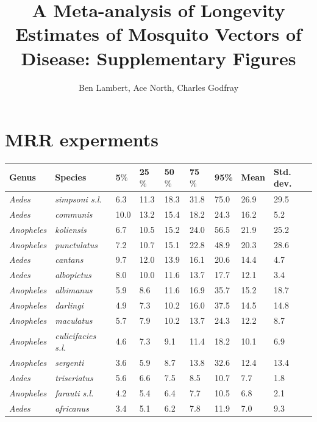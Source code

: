 \documentclass[12pt]{article}
\title{A Meta-analysis of Longevity Estimates of Mosquito Vectors of Disease: Supplementary Figures}
\author{Ben Lambert, Ace North, Charles Godfray}
\begin{document}
\maketitle

\section{MRR experments}


\begin{table}[htbp]
	\begin{tabular}{l|l|l|l|l|l|l|l|l}
		\textbf{Genus} & \textbf{Species} & \textbf{5$\%$} & \textbf{25$\%$} & \textbf{50$\%$} & \textbf{75$\%$} & \textbf{95\%} &  \textbf{Mean} & \textbf{Std. dev.}\\
		\hline
		\textit{Aedes} & \textit{simpsoni s.l.} & 6.3 & 11.3 & 18.3 & 31.8 & 75.0 & 26.9 & 29.5 \\
		\textit{Aedes} & \textit{communis} & 10.0 & 13.2 & 15.4 & 18.2 & 24.3 & 16.2 & 5.2 \\
		\textit{Anopheles} & \textit{koliensis} & 6.7 & 10.5 & 15.2 & 24.0 & 56.5 & 21.9 & 25.2 \\
		\textit{Anopheles} & \textit{punctulatus} & 7.2 & 10.7 & 15.1 & 22.8 & 48.9 & 20.3 & 28.6 \\
		\textit{Aedes} & \textit{cantans} & 9.7 & 12.0 & 13.9 & 16.1 & 20.6 & 14.4 & 4.7 \\
		\textit{Aedes} & \textit{albopictus} & 8.0 & 10.0 & 11.6 & 13.7 & 17.7 & 12.1 & 3.4 \\
		\textit{Anopheles} & \textit{albimanus} & 5.9 & 8.6 & 11.6 & 16.9 & 35.7 & 15.2 & 18.7 \\
		\textit{Anopheles} & \textit{darlingi} & 4.9 & 7.3 & 10.2 & 16.0 & 37.5 & 14.5 & 14.8 \\
		\textit{Anopheles} & \textit{maculatus} & 5.7 & 7.9 & 10.2 & 13.7 & 24.3 & 12.2 & 8.7 \\
		\textit{Anopheles} & \textit{culicifacies s.l.} & 4.6 & 7.3 & 9.1 & 11.4 & 18.2 & 10.1 & 6.9 \\
		\textit{Anopheles} & \textit{sergenti} & 3.6 & 5.9 & 8.7 & 13.8 & 32.6 & 12.4 & 13.4 \\
		\textit{Aedes} & \textit{triseriatus} & 5.6 & 6.6 & 7.5 & 8.5 & 10.7 & 7.7 & 1.8 \\
		\textit{Anopheles} & \textit{farauti s.l.} & 4.2 & 5.4 & 6.4 & 7.7 & 10.5 & 6.8 & 2.1 \\
		\textit{Aedes} & \textit{africanus} & 3.4 & 5.1 & 6.2 & 7.8 & 11.9 & 7.0 & 9.3 \\

\end{tabular}
\end{table}
\end{document}
